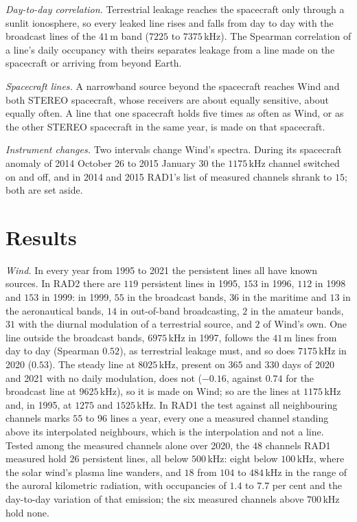 \documentclass[3p,11pt]{elsarticle}
\begin{document}
\emph{Day-to-day correlation.} Terrestrial leakage reaches the spacecraft only through a
sunlit ionosphere, so every leaked line rises and falls from day to day with the
broadcast lines of the $41$\,m band ($7225$ to $7375$\,kHz). The Spearman correlation of
a line's daily occupancy with theirs separates leakage from a line made on the
spacecraft or arriving from beyond Earth.

\emph{Spacecraft lines.} A narrowband source beyond the spacecraft reaches Wind and both
STEREO spacecraft, whose receivers are about equally sensitive, about equally often. A
line that one spacecraft holds five times as often as Wind, or as the other STEREO
spacecraft in the same year, is made on that spacecraft.

\emph{Instrument changes.} Two intervals change Wind's spectra. During its spacecraft
anomaly of 2014 October 26 to 2015 January 30 the $1175$\,kHz channel switched on and off,
and in 2014 and 2015 RAD1's list of measured channels shrank to $15$; both are set aside.

\section{Results}\label{sec:results}

\emph{Wind.} In every year from 1995 to 2021 the persistent lines all have known
sources. In RAD2 there are $119$ persistent lines in 1995, $153$ in 1996, $112$ in 1998
and $153$ in 1999: in 1999, $55$ in the broadcast bands, $36$ in the maritime and $13$ in
the aeronautical bands, $14$ in out-of-band broadcasting, $2$ in the amateur bands, $31$
with the diurnal modulation of a terrestrial source, and $2$ of Wind's own. One line
outside the broadcast bands,
$6975$\,kHz in 1997, follows the $41$\,m lines from day to day (Spearman $0.52$), as
terrestrial leakage must, and so does $7175$\,kHz in 2020 ($0.53$). The steady line at
$8025$\,kHz, present on $365$ and $330$ days of 2020 and 2021 with no daily modulation,
does not ($-0.16$, against $0.74$ for the broadcast line at $9625$\,kHz), so it is made
on Wind; so are the lines at $1175$\,kHz and, in 1995, at $1275$ and $1525$\,kHz. In
RAD1 the test against all neighbouring channels marks $55$ to $96$ lines a year, every
one a measured channel standing above its interpolated neighbours, which is the
interpolation and not a line. Tested among the measured channels alone over 2020, the
$48$ channels RAD1 measured hold $26$ persistent lines, all below $500$\,kHz: eight
below $100$\,kHz, where the solar wind's plasma line wanders, and $18$ from $104$ to
$484$\,kHz in the range of the auroral kilometric radiation, with occupancies of $1.4$
to $7.7$ per cent and the day-to-day variation of that emission; the six measured
channels above $700$\,kHz hold none.
\end{document}
